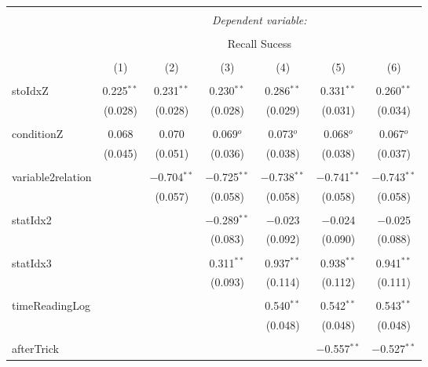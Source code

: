 
\begin{table}[!htbp] \centering 
  \caption{} 
  \label{} 
\begin{tabular}{@{\extracolsep{5pt}}lcccccc} 
\\[-1.8ex]\hline 
\hline \\[-1.8ex] 
 & \multicolumn{6}{c}{\textit{Dependent variable:}} \\ 
\cline{2-7} 
\\[-1.8ex] & \multicolumn{6}{c}{Recall Sucess} \\ 
\\[-1.8ex] & (1) & (2) & (3) & (4) & (5) & (6)\\ 
\hline \\[-1.8ex] 
 stoIdxZ & 0.225$^{**}$ & 0.231$^{**}$ & 0.230$^{**}$ & 0.286$^{**}$ & 0.331$^{**}$ & 0.260$^{**}$ \\ 
  & (0.028) & (0.028) & (0.028) & (0.029) & (0.031) & (0.034) \\ 
  & & & & & & \\ 
 conditionZ & 0.068 & 0.070 & 0.069$^{o}$ & 0.073$^{o}$ & 0.068$^{o}$ & 0.067$^{o}$ \\ 
  & (0.045) & (0.051) & (0.036) & (0.038) & (0.038) & (0.037) \\ 
  & & & & & & \\ 
 variable2relation &  & $-$0.704$^{**}$ & $-$0.725$^{**}$ & $-$0.738$^{**}$ & $-$0.741$^{**}$ & $-$0.743$^{**}$ \\ 
  &  & (0.057) & (0.058) & (0.058) & (0.058) & (0.058) \\ 
  & & & & & & \\ 
 statIdx2 &  &  & $-$0.289$^{**}$ & $-$0.023 & $-$0.024 & $-$0.025 \\ 
  &  &  & (0.083) & (0.092) & (0.090) & (0.088) \\ 
  & & & & & & \\ 
 statIdx3 &  &  & 0.311$^{**}$ & 0.937$^{**}$ & 0.938$^{**}$ & 0.941$^{**}$ \\ 
  &  &  & (0.093) & (0.114) & (0.112) & (0.111) \\ 
  & & & & & & \\ 
 timeReadingLog &  &  &  & 0.540$^{**}$ & 0.542$^{**}$ & 0.543$^{**}$ \\ 
  &  &  &  & (0.048) & (0.048) & (0.048) \\ 
  & & & & & & \\ 
 afterTrick &  &  &  &  & $-$0.557$^{**}$ & $-$0.527$^{**}$ \\ 

\end{tabular}
\end{table}
